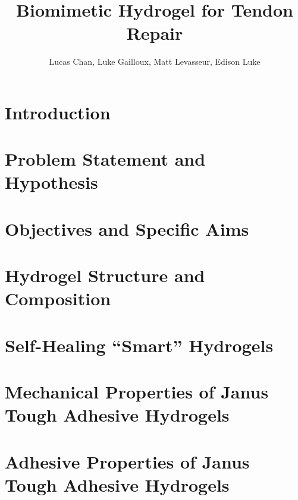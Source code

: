 \documentclass[
    letterpaper,
    10pt,
    unnumberedsections,
    twoside
]{LTJournalArticle}
\title{Biomimetic Hydrogel for Tendon Repair}
\author{Lucas Chan, Luke Gailloux, Matt Levasseur, Edison Luke}
\begin{document}
    \maketitle 

    \section{Introduction}

    

    \section{Problem Statement and Hypothesis}

    
    
    \section{Objectives and Specific Aims}

    

    \section{Hydrogel Structure and Composition}

    

    \section{Self-Healing ``Smart'' Hydrogels}

    

    

    \section{Mechanical Properties of Janus Tough Adhesive Hydrogels}

    

    \section{Adhesive Properties of Janus Tough Adhesive Hydrogels}

    
\end{document}
